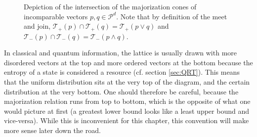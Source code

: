 \begin{figure}[h!]
    \centering
    \caption{Depiction of the intersection of the majorization cones of incomparable vectors $p, q \in \mathcal{P}^d$. Note that by definition of the meet and join, $\mathcal{T}_+ (p) \cap \mathcal{T}_+ (q) = \mathcal{T}_+ (p \vee q)$ and $\mathcal{T}_- (p) \cap \mathcal{T}_- (q) = \mathcal{T}_- (p \wedge q)$.}
    \label{fig:meet_join_example}
\end{figure}

In classical and quantum information, the lattice is usually drawn with more disordered vectors at the top and more ordered vectors at the bottom because the entropy of a state is considered a resource (cf. section \ref{sec:QRT}). This means that the uniform distribution sits at the very top of the diagram, and the certain distribution at the very bottom. One should therefore be careful, because the majorization relation runs from top to bottom, which is the opposite of what one would picture at first (a greatest lower bound looks like a least upper bound and vice-versa). While this is inconvenient for this chapter, this convention will make more sense later down the road.



